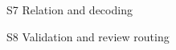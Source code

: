 \begin{frame}{S7 Relation and decoding}
\end{frame}

\begin{frame}{S8 Validation and review routing}
\end{frame}

